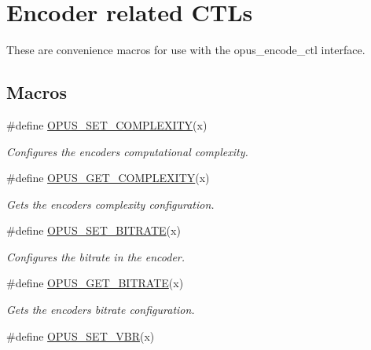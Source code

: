 \hypertarget{group__opus__encoderctls}{}\section{Encoder related C\+T\+Ls}
\label{group__opus__encoderctls}


These are convenience macros for use with the {\ttfamily opus\+\_\+encode\+\_\+ctl} interface.  


\subsection*{Macros}
\begin{DoxyCompactItemize}
\item 
\#define \hyperlink{group__opus__encoderctls_ga3483877bf1687a75dd4a1de6f85f291c}{O\+P\+U\+S\+\_\+\+S\+E\+T\+\_\+\+C\+O\+M\+P\+L\+E\+X\+I\+TY}(x)
\begin{DoxyCompactList}\small\item\em Configures the encoder\textquotesingle{}s computational complexity. \end{DoxyCompactList}\item 
\#define \hyperlink{group__opus__encoderctls_ga89755ee721a38d964c7630a920eb27d2}{O\+P\+U\+S\+\_\+\+G\+E\+T\+\_\+\+C\+O\+M\+P\+L\+E\+X\+I\+TY}(x)
\begin{DoxyCompactList}\small\item\em Gets the encoder\textquotesingle{}s complexity configuration. \end{DoxyCompactList}\item 
\#define \hyperlink{group__opus__encoderctls_ga0bb51947e355b33d0cb358463b5101a7}{O\+P\+U\+S\+\_\+\+S\+E\+T\+\_\+\+B\+I\+T\+R\+A\+TE}(x)
\begin{DoxyCompactList}\small\item\em Configures the bitrate in the encoder. \end{DoxyCompactList}\item 
\#define \hyperlink{group__opus__encoderctls_ga1427a5560cbc7e9a59f986d89c05082c}{O\+P\+U\+S\+\_\+\+G\+E\+T\+\_\+\+B\+I\+T\+R\+A\+TE}(x)
\begin{DoxyCompactList}\small\item\em Gets the encoder\textquotesingle{}s bitrate configuration. \end{DoxyCompactList}\item 
\#define \hyperlink{group__opus__encoderctls_ga34d09ae06cab7e1a6c49876249b67892}{O\+P\+U\+S\+\_\+\+S\+E\+T\+\_\+\+V\+BR}(x)

\end{DoxyCompactItemize}

